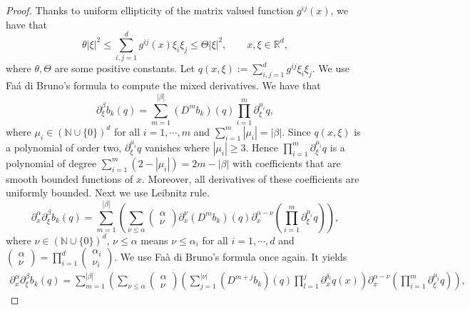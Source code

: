 \documentclass[12pt]{amsart}
\numberwithin{equation}{section}
\theoremstyle{definition}
\theoremstyle{remark}
\numberwithin{equation}{section}
\begin{document}
	\begin{proof}
		Thanks to uniform ellipticity of the matrix valued function $g^{ij}(x)$, we have that
		\[
		\theta |\xi|^2 \leq \sum_{i,j=1}^d g^{ij}(x)\xi_i\xi_j\leq \Theta |\xi|^2,
		\qquad x,\xi\in\mathbb{R}^d,
		\]
		where $\theta, \Theta$ are some positive constants. Let $q(x,\xi):=\sum_{i,j=1}^d g^{ij}\xi_i\xi_j$. We use Fa\'a di Bruno's formula to compute the mixed derivatives. We have that  
		\[
		\partial^{\beta}_{\xi} b_k(q)= \sum_{m=1}^{|\beta|} (D^m b_k)(q) \prod_{i=1}^m \partial_{\xi}^{\mu_i} q, 
		\]
		where $\mu_i\in (\mathbb{N}\cup\{0\})^d$ for all $i=1,\cdots,m$ and $\displaystyle{\sum_{i=1}^m |\mu_i|=|\beta|}$. Since $q(x,\xi)$ is a polynomial of order two, $\partial_{\xi}^{\mu_i}q$ vanishes where $|\mu_i|\geq 3$. Hence $\displaystyle{\prod_{i=1}^m \partial_{\xi}^{\mu_i} q}$ is a polynomial of degree $\displaystyle{\sum_{i=1}^m (2-|\mu_i|)}=2m-|\beta|$ with coefficients that are smooth bounded functions of $x$. Moreover, all derivatives of these coefficients are uniformly bounded. Next we use Leibnitz rule. 
		\[
		\partial_{x}^{\alpha}\partial_{\xi}^{\beta} b_k(q)= \sum_{m=1}^{|\beta|} \left( \sum_{\nu\leq \alpha} \begin{pmatrix}
			\alpha\\ \nu
		\end{pmatrix} \partial^{\nu}_{x}(D^m b_k)(q) \partial^{\alpha-\nu}_{x}\left(\prod_{i=1}^m \partial_{\xi}^{\mu_i} q\right)\right),
		\]
		where $\nu\in(\mathbb{N}\cup\{0\})^d$, $\nu\leq \alpha$ means $\nu\leq \alpha_i$ for all $i=1,\cdots, d$ and $\displaystyle{\begin{pmatrix}
				\alpha\\ \nu
			\end{pmatrix}=\prod_{i=1}^d \begin{pmatrix}
				\alpha_i\\ \nu_i
		\end{pmatrix}}$. We use Fa\`a di Bruno's formula once again. It yields
		\begin{align}\label{intermediate 1}
			\partial_{x}^{\alpha}\partial_{\xi}^{\beta} b_k(q)= \sum_{m=1}^{|\beta|} \left( \sum_{\nu\leq \alpha} \begin{pmatrix}
				\alpha\\ \nu
			\end{pmatrix} \left(\sum_{j=1}^{|\nu|} (D^{m+j} b_k)(q) \prod_{l=1}^{j} \partial_x^{\delta_l} q(x)\right) \partial^{\alpha-\nu}_{x}\left(\prod_{i=1}^m \partial_{\xi}^{\mu_i} q\right)\right),
		\end{align}

\end{proof}
\end{document}
